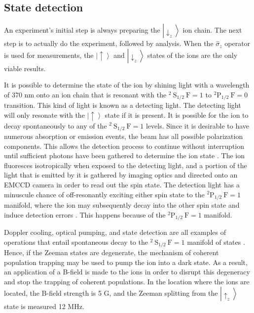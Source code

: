 \subsection{State detection}

An experiment's initial step is always preparing the $\left|\downarrow_z\right\rangle$ ion chain. The next step is to actually do the experiment, followed by analysis. When the $\hat{\sigma}_z$ operator is used for measurements, the $\left|\uparrow\right\rangle$ and $\left|\downarrow_z\right\rangle$ states of the ions are the only viable results.

It is possible to determine the state of the ion by shining light with a wavelength of 370 nm onto an ion chain that is resonant with the ${ }^2 \mathrm{~S}_{1 / 2} \mathrm{~F}=1$ to ${ }^2 \mathrm{P}_{1 / 2} \mathrm{~F}=0$ transition. This kind of light is known as a detecting light. The detecting light will only resonate with the $\left|\uparrow\right\rangle$ state if it is present. It is possible for the ion to decay spontaneously to any of the ${ }^2 \mathrm{~S}_{1 / 2} \mathrm{~F}=1$ levels. Since it is desirable to have numerous absorption or emission events, the beam has all possible polarization components. This allows the detection process to continue without interruption until sufficient photons have been gathered to determine the ion state \cite{RN221,RN298,RN104,RN222}. The ion fluoresces isotropically when exposed to the detecting light, and a portion of the light that is emitted by it is gathered by imaging optics and directed onto an EMCCD camera in order to read out the spin state. The detection light has a minuscule chance of off-resonantly exciting either spin state to the ${ }^2 \mathrm{P}_{1 / 2} \mathrm{~F}=1$ manifold, where the ion may subsequently decay into the other spin state and induce detection errors \cite{RN235}. This happens because of the ${ }^2 \mathrm{P}_{1 / 2} \mathrm{~F}=1$ manifold.

Doppler cooling, optical pumping, and state detection are all examples of operations that entail spontaneous decay to the ${ }^2 \mathrm{~S}_{1 / 2} \mathrm{~F}=1$ manifold of states \cite{RN215}. Hence, if the Zeeman states are degenerate, the mechanism of coherent population trapping may be used to pump the ion into a dark state. As a result, an application of a B-field is made to the ions in order to disrupt this degeneracy and stop the trapping of coherent populations. In the location where the ions are located, the B-field strength is 5 G, and the Zeeman splitting from the $\left|\uparrow_z\right\rangle$ state is measured 12 MHz.

